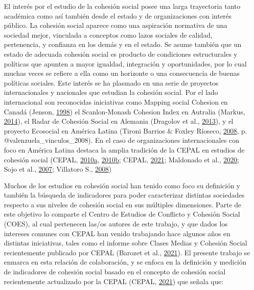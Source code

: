 \documentclass[
  12pt,
]{book}
\begin{document}
El interés por el estudio de la cohesión social posee una larga trayectoria tanto académica como así también desde el estado y de organizaciones con interés público. La cohesión social aparece como una aspiración normativa de una sociedad mejor, vinculada a conceptos como lazos sociales de calidad, pertenencia, y confianza en los demás y en el estado. Se asume también que un estado de adecuada cohesión social es producto de condiciones estructurales y políticas que apunten a mayor igualdad, integración y oportunidades, por lo cual muchas veces se refiere a ella como un horizonte o una consecuencia de buenas políticas sociales. Este interés se ha plasmado en una serie de proyectos internacionales y nacionales que estudian la cohesión social. Por el lado internacional son reconocidas iniciativas como Mapping social Cohesion en Canadá (Jenson, \protect\hyperlink{ref-jenson_mapping_1998}{1998}) el Scanlon-Monash Cohesion Index en Autralia (Markus, \protect\hyperlink{ref-markus_mapping_2014}{2014}), el Radar de Cohesión Social en Alemania (Dragolov et al., \protect\hyperlink{ref-dragolov_social_2013}{2013}), y el proyecto Ecosocial en América Latina (Tironi Barrios \& Foxley Ríoseco, \protect\hyperlink{ref-tironibarrios_redes_2008}{2008}, p. @valenzuela\_vinculos\_2008). En el caso de organizaciones internacionales con foco en América Latina destaca la amplia tradición de la CEPAL en estudios de cohesión social (CEPAL, \protect\hyperlink{ref-cepal_america_2010}{2010}\protect\hyperlink{ref-cepal_america_2010}{a}, \protect\hyperlink{ref-cepal_cohesion_2010}{2010}\protect\hyperlink{ref-cepal_cohesion_2010}{b}; CEPAL, \protect\hyperlink{ref-cepal_cohesion_2021}{2021}; Maldonado et al., \protect\hyperlink{ref-maldonado_inclusion_2020}{2020}; Sojo et al., \protect\hyperlink{ref-sojo_cohesion_2007}{2007}; Villatoro S., \protect\hyperlink{ref-villatoros._sistema_2008}{2008})

Muchos de los estudios en cohesión social han tenido como foco su definición y también la búsqueda de indicadores para poder caracterizar distintas sociedades respecto a sus niveles de cohesión social en sus múltiples dimensiones. Parte de este objetivo lo comparte el Centro de Estudios de Conflicto y Cohesión Social (COES), al cual pertenecen las/os autores de este trabajo, y que dados los intereses comunes con CEPAL han venido trabajando hace algunos años en distintas iniciativas, tales como el informe sobre Clases Medias y Cohesión Social recientemente publicado por CEPAL (Barozet et al., \protect\hyperlink{ref-barozet_clases_2021}{2021}). El presente trabajo se enmarca en esta relación de colaboración, y se enfoca en la definición y medición de indicadores de cohesión social basado en el concepto de cohesión social recientemente actualizado por la CEPAL (CEPAL, \protect\hyperlink{ref-cepal_cohesion_2021}{2021}) que señala que:
\end{document}
